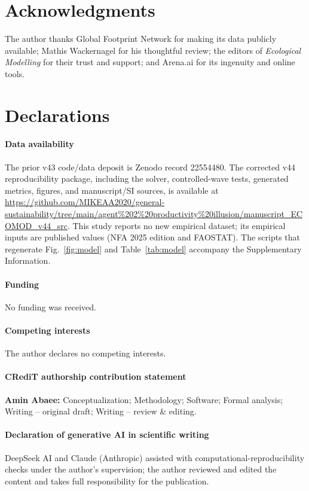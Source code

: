 \section*{Acknowledgments}

The author thanks Global Footprint Network for making its data publicly available; Mathis Wackernagel for his thoughtful review; the editors of \emph{Ecological Modelling} for their trust and support; and Arena.ai for its ingenuity and online tools.

\section*{Declarations}

\paragraph{Data availability} The prior v43 code/data deposit is Zenodo record 22554480. The corrected v44 reproducibility package, including the solver, controlled-wave tests, generated metrics, figures, and manuscript/SI sources, is available at \url{https://github.com/MIKEAA2020/general-sustainability/tree/main/agent%202%20productivity%20illusion/manuscript_ECOMOD_v44_src}. This study reports no new empirical dataset; its empirical inputs are published values (NFA 2025 edition and FAOSTAT). The scripts that regenerate Fig.~\ref{fig:model} and Table~\ref{tab:model} accompany the Supplementary Information.

\paragraph{Funding} No funding was received.

\paragraph{Competing interests} The author declares no competing interests.

\paragraph{CRediT authorship contribution statement} \textbf{Amin Abaee:} Conceptualization; Methodology; Software; Formal analysis; Writing -- original draft; Writing -- review \& editing.

\paragraph{Declaration of generative AI in scientific writing} DeepSeek AI and Claude (Anthropic) assisted with computational-reproducibility checks under the author's supervision; the author reviewed and edited the content and takes full responsibility for the publication.
